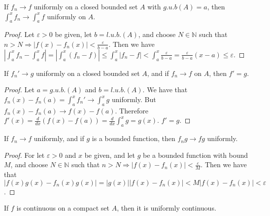 \documentclass[crop=false,class=book]{standalone}
\begin{document}
\begin{theorem} If $f_n\rightarrow f$ uniformly on a closed bounded set $A$ with $g.u.b(A)=a$, then $\int_{a}^{x} f_n \rightarrow \int_{a}^{x} f$ uniformly on $A$.
\end{theorem}
\begin{proof}
Let $\varepsilon >0$ be given, let $b=l.u.b.(A)$, and choose $N\in\mathbb{N}$ such that $n>N\Rightarrow |f(x)-f_n(x)|<\frac{\varepsilon}{b-a}$. Then we have $|\int_{a}^{x} f_n - \int_{a}^{x} f| = |\int_{a}^{x} (f_n-f)| \leq \int_{a}^{x} |f_n-f| < \int_{a}^{x} \frac{\varepsilon}{b-a}= \frac{\varepsilon}{b-a}(x-a) \leq \varepsilon$. 
\end{proof}
\begin{theorem}
If $f_n'\rightarrow g$ uniformly on a closed bounded set $A$, and if $f_n \rightarrow f$ on $A$, then $f' = g$.
\end{theorem}
\begin{proof} Let $a=g.u.b.(A)$ and $b=l.u.b.(A)$. We have that $f_n(x) - f_n(a) = \int_{a}^{x}f_n' \rightarrow \int_{a}^{x}g$ uniformly. But $f_n(x)-f_n(a) \rightarrow f(x) - f(a)$. Therefore $f'(x)=\frac{d}{dx}(f(x)-f(a)) = \frac{d}{dx}\int_{a}^{x} g = g(x)$. $f' = g$.
\end{proof}
\begin{theorem}  If $f_n \rightarrow f$ uniformly, and if $g$ is a bounded function, then $f_n g \rightarrow fg$ uniformly.
\end{theorem}
\begin{proof}
For let $\varepsilon>0$ and $x$ be given, and let $g$ be a bounded function with bound $M$, and choose $N\in\mathbb{N}$ such that $n>N \Rightarrow |f(x)-f_n(x)|<\frac{\varepsilon}{M}$. Then we have that $|f(x)g(x)-f_n(x)g(x)| = |g(x)||f(x)-f_n(x)| < M|f(x)-f_n(x)| <\varepsilon$.
\end{proof}
\begin{theorem}
If $f$ is continuous on a compact set $A$, then it is uniformly continuous.
\end{theorem}
\end{document}
